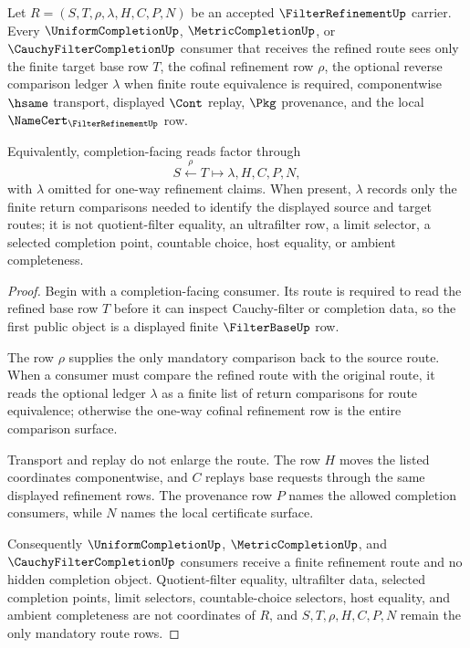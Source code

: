 \begin{theorem}
\label{thm:filter-refinement-completion-route}
Let $R=(S,T,\rho,\lambda,H,C,P,N)$ be an accepted $\FilterRefinementUp$ carrier. Every $\UniformCompletionUp$, $\MetricCompletionUp$, or $\CauchyFilterCompletionUp$ consumer that receives the refined route sees only the finite target base row $T$, the cofinal refinement row $\rho$, the optional reverse comparison ledger $\lambda$ when finite route equivalence is required, componentwise $\hsame$ transport, displayed $\Cont$ replay, $\Pkg$ provenance, and the local $\NameCert_{\FilterRefinementUp}$ row.

Equivalently, completion-facing reads factor through
$$
S \xleftarrow{\rho} T \longmapsto \lambda,H,C,P,N ,
$$
with $\lambda$ omitted for one-way refinement claims. When present, $\lambda$ records only the finite return comparisons needed to identify the displayed source and target routes; it is not quotient-filter equality, an ultrafilter row, a limit selector, a selected completion point, countable choice, host equality, or ambient completeness.
\end{theorem}
\begin{proof}
Begin with a completion-facing consumer. Its route is required to read the refined base row $T$ before it can inspect Cauchy-filter or completion data, so the first public object is a displayed finite $\FilterBaseUp$ row.

The row $\rho$ supplies the only mandatory comparison back to the source route. When a consumer must compare the refined route with the original route, it reads the optional ledger $\lambda$ as a finite list of return comparisons for route equivalence; otherwise the one-way cofinal refinement row is the entire comparison surface.

Transport and replay do not enlarge the route. The row $H$ moves the listed coordinates componentwise, and $C$ replays base requests through the same displayed refinement rows. The provenance row $P$ names the allowed completion consumers, while $N$ names the local certificate surface.

Consequently $\UniformCompletionUp$, $\MetricCompletionUp$, and $\CauchyFilterCompletionUp$ consumers receive a finite refinement route and no hidden completion object. Quotient-filter equality, ultrafilter data, selected completion points, limit selectors, countable-choice selectors, host equality, and ambient completeness are not coordinates of $R$, and $S,T,\rho,H,C,P,N$ remain the only mandatory route rows.
\end{proof}

